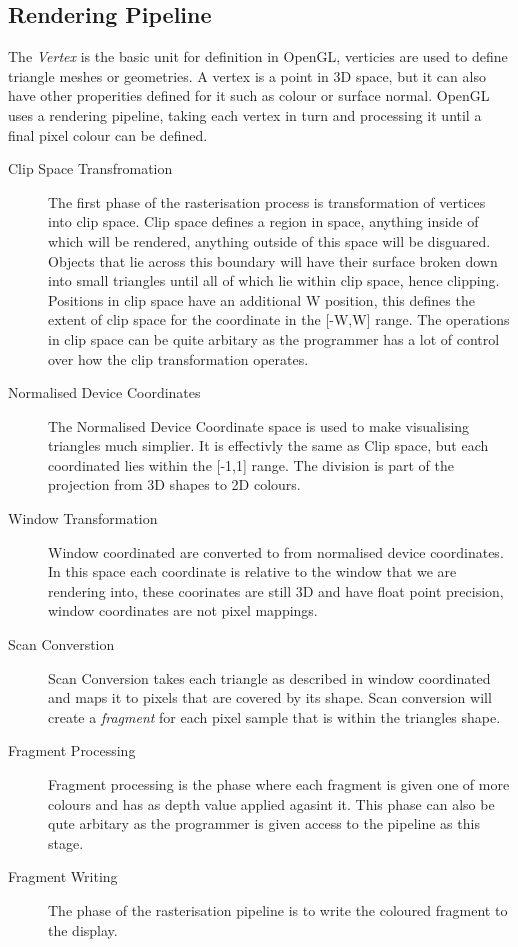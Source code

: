 \subsection{Rendering Pipeline}
The \emph{Vertex} is the basic unit for definition in OpenGL, verticies are used
to define triangle meshes or geometries. A vertex is a point in 3D space, but it
can also have other properities defined for it such as colour or surface normal.
OpenGL uses a rendering pipeline, taking each vertex in turn and processing it 
until a final pixel colour can be defined. \\

\begin{description}
\item[Clip Space Transfromation] The first phase of the rasterisation process
is transformation of vertices into clip space. Clip space defines a region in 
space, anything inside of which will be rendered, anything outside of this space
will be disguared. Objects that lie across this boundary will have their surface
broken down into small triangles until all of which lie within clip space, hence
clipping. Positions in clip space have an additional W position, this defines the
extent of clip space for the coordinate in the [-W,W] range.
The operations in clip space can be quite arbitary as the programmer 
has a lot of control over how the clip transformation operates.

\item[Normalised Device Coordinates] The Normalised Device Coordinate space is 
used to make visualising triangles much simplier. It is effectivly the same as 
Clip space, but each coordinated lies within the [-1,1] range. The division is 
part of the projection from 3D shapes to 2D colours.
\item[Window Transformation] Window coordinated are converted to from normalised
device coordinates. In this space each coordinate is relative to the window that
we are rendering into, these coorinates are still 3D and have float point 
precision, window coordinates are not pixel mappings.
\item[Scan Converstion] Scan Conversion takes each triangle as described in 
window coordinated and maps it to pixels that are covered by its shape. Scan 
conversion will create a \emph{fragment} for each pixel sample that is within
the triangles shape.
\item[Fragment Processing] Fragment processing is the phase where each fragment 
is given one of more colours and has as depth value applied agasint it. This 
phase can also be qute arbitary as the programmer is given access to the pipeline
as this stage.
\item[Fragment Writing] The phase of the rasterisation pipeline is to write the 
coloured fragment to the display.
\end{description}


